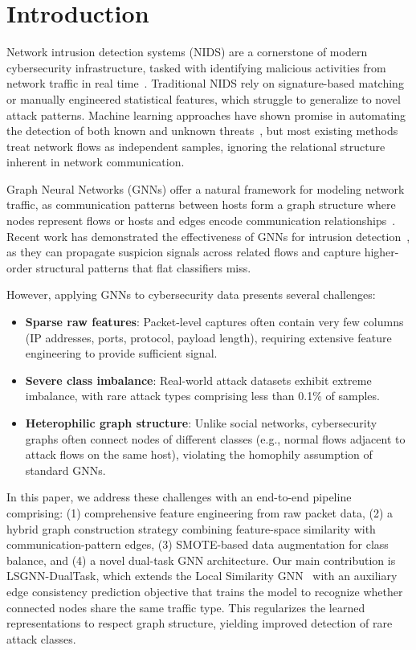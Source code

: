 \documentclass[conference]{IEEEtran}
\begin{document}
\section{Introduction}

Network intrusion detection systems (NIDS) are a cornerstone of modern cybersecurity infrastructure, tasked with identifying malicious activities from network traffic in real time~\cite{buczak2016survey}. Traditional NIDS rely on signature-based matching or manually engineered statistical features, which struggle to generalize to novel attack patterns. Machine learning approaches have shown promise in automating the detection of both known and unknown threats~\cite{ahmad2021network}, but most existing methods treat network flows as independent samples, ignoring the relational structure inherent in network communication.

Graph Neural Networks (GNNs) offer a natural framework for modeling network traffic, as communication patterns between hosts form a graph structure where nodes represent flows or hosts and edges encode communication relationships~\cite{zhou2020graph}. Recent work has demonstrated the effectiveness of GNNs for intrusion detection~\cite{lo2022graphsage_ids, chang2021gnn_nids}, as they can propagate suspicion signals across related flows and capture higher-order structural patterns that flat classifiers miss.

However, applying GNNs to cybersecurity data presents several challenges:
\begin{itemize}
    \item \textbf{Sparse raw features}: Packet-level captures often contain very few columns (IP addresses, ports, protocol, payload length), requiring extensive feature engineering to provide sufficient signal.
    \item \textbf{Severe class imbalance}: Real-world attack datasets exhibit extreme imbalance, with rare attack types comprising less than 0.1\% of samples.
    \item \textbf{Heterophilic graph structure}: Unlike social networks, cybersecurity graphs often connect nodes of different classes (e.g., normal flows adjacent to attack flows on the same host), violating the homophily assumption of standard GNNs.
\end{itemize}

In this paper, we address these challenges with an end-to-end pipeline comprising: (1) comprehensive feature engineering from raw packet data, (2) a hybrid graph construction strategy combining feature-space similarity with communication-pattern edges, (3) SMOTE-based data augmentation for class balance, and (4) a novel dual-task GNN architecture. Our main contribution is LSGNN-DualTask, which extends the Local Similarity GNN~\cite{wu2023lsgnn} with an auxiliary edge consistency prediction objective that trains the model to recognize whether connected nodes share the same traffic type. This regularizes the learned representations to respect graph structure, yielding improved detection of rare attack classes.
\end{document}
